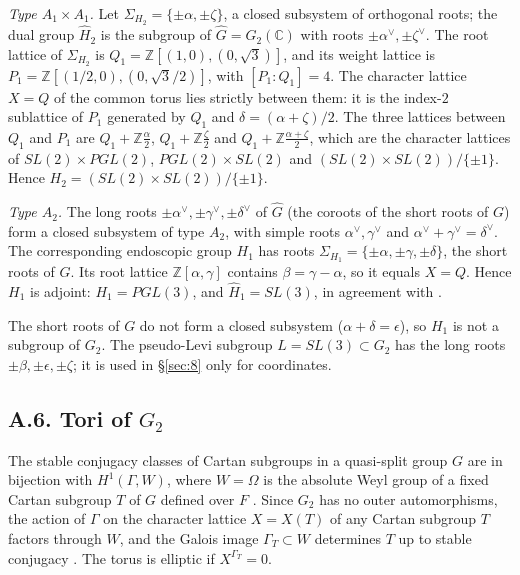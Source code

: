 \documentclass[12pt,letterpaper]{amsart}
\makeatletter
\theoremstyle{plain}
\theoremstyle{definition}
\newcommand{\fixedlabel}[1]{\phantomsection\def\@currentlabel{#1}}
\theoremstyle{remark}
\theoremstyle{definition}
\newcommand{\zzz}{\mathbb{Z}}
\makeatother
\begin{document}
\emph{Type $A_1\times A_1$.} Let $\Sigma_{H_2}=\{\pm\alpha,\pm\zeta\}$, a
closed subsystem of orthogonal roots; the dual group $\widehat H_2$ is the
subgroup of $\widehat G=G_2(\mathbb C)$ with roots $\pm\alpha^\vee,\pm\zeta^\vee$.
The root lattice of $\Sigma_{H_2}$ is
$Q_1={\mathbb Z}[(1,0),(0,\sqrt{3})]$, and its weight lattice is
$P_1={\mathbb Z}[(1/2,0),(0,\sqrt{3}/2)]$, with $[P_1:Q_1]=4$. The
character lattice $X=Q$ of the common torus lies strictly between them: it
is the index-$2$ sublattice of $P_1$ generated by $Q_1$ and
$\delta=(\alpha+\zeta)/2$. The three lattices between $Q_1$ and $P_1$ are
$Q_1+\zzz\frac\alpha2$, $Q_1+\zzz\frac\zeta2$ and $Q_1+\zzz\frac{\alpha+\zeta}2$,
which are the character lattices of $SL(2)\times PGL(2)$,
$PGL(2)\times SL(2)$ and $(SL(2)\times SL(2))/\{\pm1\}$. Hence
$H_2=(SL(2)\times SL(2))/\{\pm 1\}$.

\emph{Type $A_2$.} The long roots $\pm\alpha^\vee,\pm\gamma^\vee,\pm\delta^\vee$
of $\widehat G$ (the coroots of the short roots of $G$) form a closed
subsystem of type $A_2$, with simple roots $\alpha^\vee,\gamma^\vee$ and
$\alpha^\vee+\gamma^\vee=\delta^\vee$. The corresponding endoscopic group
$H_1$ has roots $\Sigma_{H_1}=\{\pm\alpha,\pm\gamma,\pm\delta\}$, the short
roots of $G$. Its root lattice $\zzz[\alpha,\gamma]$ contains
$\beta=\gamma-\alpha$, so it equals $X=Q$. Hence $H_1$ is adjoint:
$H_1=PGL(3)$, and $\widehat H_1=SL(3)$, in agreement with
\cite[Ch.~II, 5.3--5.5]{SS86}.

The short roots of $G$ do not form a closed subsystem
($\alpha+\delta=\epsilon$), so $H_1$ is not a subgroup of $G_2$. The
pseudo-Levi subgroup $L=SL(3)\subset G_2$ has the long roots
$\pm\beta,\pm\epsilon,\pm\zeta$; it is used in \S\ref{sec:8} only for
coordinates.

\subsection*{A.6. Tori of \texorpdfstring{$G_2$}{G2}}\fixedlabel{A.6}\label{sec:A6}

The stable conjugacy classes of Cartan subgroups in a quasi-split group $G$
are in bijection with $H^1(\Gamma, W)$, where $W=\Omega$ is the absolute
Weyl group of a fixed Cartan subgroup $T$ of $G$ defined over $F$
\cite[\S4, Lemma~3]{Ro80}. Since $G_2$ has no outer automorphisms, the
action of $\Gamma$ on the character lattice $X=X(T)$ of any Cartan subgroup
$T$ factors through $W$, and the Galois image $\Gamma_T\subset W$ determines
$T$ up to stable conjugacy \cite{Sa71}. The torus is elliptic if
$X^{\Gamma_T}=0$.
\end{document}
